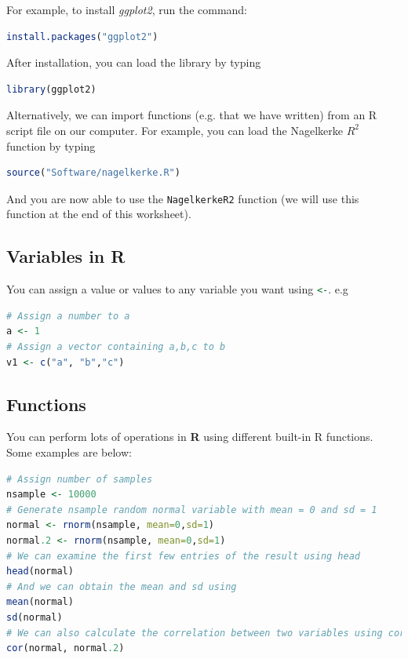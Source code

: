 \documentclass[12pt,openany]{scrbook}
\begin{document}
\noindent For example, to install \textit{ggplot2}, run the command:
\begin{lstlisting}[language=R]
install.packages("ggplot2")
\end{lstlisting}

\noindent After installation, you can load the library by typing
\begin{lstlisting}[language=R]
library(ggplot2)
\end{lstlisting}

\noindent Alternatively, we can import functions (e.g. that we have written) from an R script file on our computer. 
For example, you can load the Nagelkerke $R^2$ function by typing
\begin{lstlisting}[language=R]
source("Software/nagelkerke.R")
\end{lstlisting}
And you are now able to use the \lstinline[language=R]|NagelkerkeR2| function (we will use this function at the end of this worksheet).

\subsection{Variables in R}
You can assign a value or values to any variable you want using \lstinline[language=R]|<-|. 
e.g
\begin{lstlisting}[language=R]
# Assign a number to a
a <- 1
# Assign a vector containing a,b,c to b
v1 <- c("a", "b","c")
\end{lstlisting}

\subsection{Functions}
You can perform lots of operations in \textbf{R} using different built-in R functions. 
Some examples are below:\\

\begin{lstlisting}[language=R]
# Assign number of samples
nsample <- 10000
# Generate nsample random normal variable with mean = 0 and sd = 1
normal <- rnorm(nsample, mean=0,sd=1)
normal.2 <- rnorm(nsample, mean=0,sd=1)
# We can examine the first few entries of the result using head
head(normal)
# And we can obtain the mean and sd using
mean(normal)
sd(normal)
# We can also calculate the correlation between two variables using cor
cor(normal, normal.2)
\end{lstlisting}
\end{document}

